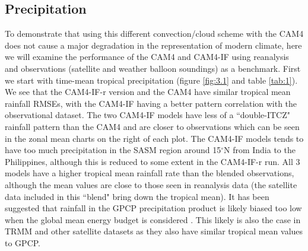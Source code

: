 \documentclass[letterpaper,12pt,titlepage,oneside,final]{book}
\begin{document}
\subsection{Precipitation}
To demonstrate that using this different convection/cloud scheme with the CAM4 does not cause a major degradation in the representation of modern climate, here we will examine the performance of the CAM4 and CAM4-IF using reanalysis and observations (satellite and weather balloon soundings) as a benchmark. First we start with time-mean tropical precipitation (figure \ref{fig:3.1} and table \ref{tab:1}). We see that the CAM4-IF-r version and the CAM4 have similar tropical mean rainfall RMSEs, with the CAM4-IF having a better pattern correlation with the observational dataset. The two CAM4-IF models  have less of a ``double-ITCZ" rainfall pattern \citep{mechoso_seasonal_1995} than the CAM4 and are closer to observations which can be seen in the zonal mean charts on the right of each plot. The CAM4-IF models tends to have too much precipitation in the SASM region around 15$^\circ$N from India to the Philippines, although this is reduced to some extent in the CAM4-IF-r run. All 3 models have a higher tropical mean rainfall rate than the blended observations, although the mean values are close to those seen in reanalysis data (the satellite data included in this ``blend" bring down the tropical mean). It has been suggested that rainfall in the GPCP precipitation product is likely biased too low when the global mean energy budget is considered \citep{trenberth_earths_2009,trenberth_regional_2013}. This likely is also the case in TRMM and other satellite datasets as they also have similar tropical mean values to GPCP.
\end{document}
